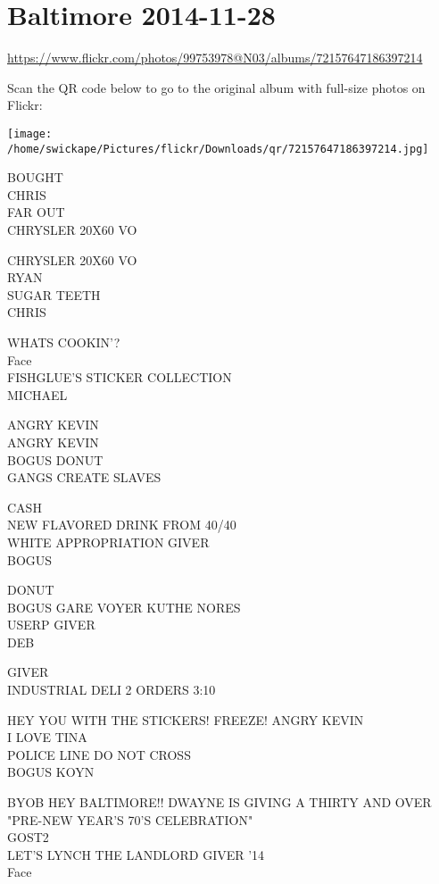 \documentclass[10pt,letterpaper]{article}
\begin{document}
\section*{Baltimore 2014-11-28}

\url{https://www.flickr.com/photos/99753978@N03/albums/72157647186397214}

Scan the QR code below to go to the original album with full-size photos on Flickr:

\texttt{[image: /home/swickape/Pictures/flickr/Downloads/qr/72157647186397214.jpg]}


BOUGHT\\
CHRIS\\
FAR OUT\\
CHRYSLER 20X60 VO

CHRYSLER 20X60 VO\\
RYAN\\
SUGAR TEETH\\
CHRIS

WHATS COOKIN'?\\
Face\\
FISHGLUE'S STICKER COLLECTION\\
MICHAEL

ANGRY KEVIN\\
ANGRY KEVIN\\
BOGUS DONUT\\
GANGS CREATE SLAVES

CASH\\
NEW FLAVORED DRINK FROM 40/40\\
WHITE APPROPRIATION GIVER\\
BOGUS

DONUT\\
BOGUS GARE VOYER KUTHE NORES\\
USERP GIVER\\
DEB

GIVER\\
INDUSTRIAL DELI 2 ORDERS 3:10

HEY YOU WITH THE STICKERS!  FREEZE!  ANGRY KEVIN\\
I LOVE TINA\\
POLICE LINE DO NOT CROSS\\
BOGUS KOYN

BYOB HEY BALTIMORE!! DWAYNE IS GIVING A THIRTY AND OVER "PRE{-}NEW YEAR'S 70'S CELEBRATION"\\
GOST2\\
LET'S LYNCH THE LANDLORD GIVER '14\\
Face
\end{document}
